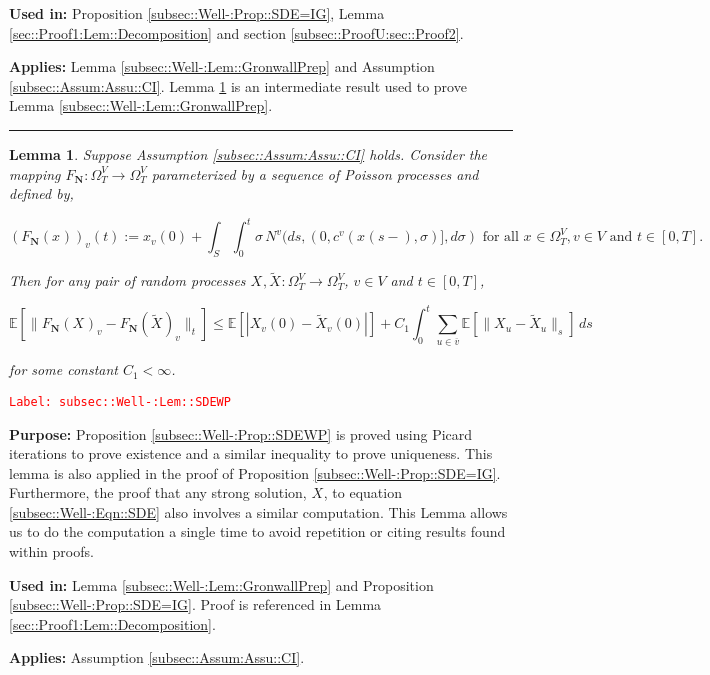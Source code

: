 \documentclass[12pt]{article}
\newcommand{\mb}{\mathbb}
\newcommand{\ra}{\rightarrow}
\newcommand{\ov}{\overline}
\newcommand{\te}{\text}
\newcommand{\tr}{\textcolor{red}}
\newcommand{\labe}[1]{\tr{\texttt{Label: #1}}}
\newcommand{\purpose}{\textbf{Purpose: }}
\newcommand{\usein}{\textbf{Used in: }}
\newcommand{\app}{\textbf{Applies: }}
\newcommand{\lin}{\rule{\linewidth}{0.4 pt}}
\newcommand{\ex}[1]{\mb{E}\left[#1\right]}			%
\renewcommand{\v}{v}							%
\newcommand{\vv}{u}								%
\renewcommand{\S}{S}							%
\newcommand{\s}{\sigma}							%
\newcommand{\T}{T}								%
\newcommand{\x}{x}								%
\renewcommand{\t}{t}							%
\newcommand{\sset}{\Omega}						%
\renewcommand{\tt}{s}							%
\newcommand{\X}{X}								%
\newcommand{\IGr}{c}							%
\newcommand{\vind}[1]{^{#1}}					%
\newcommand{\vsi}[1]{^{#1}}						%
\newcommand{\cind}[1]{_{#1}}					%
\newcommand{\cl}{\ov}							%
\newcommand{\tp}[1]{(#1)}						%
\newcommand{\tip}[1]{#1}						%
\newcommand{\ts}[1]{_{#1}}						%
\newcommand{\const}{C}							%
\newcommand{\poisses}{\mathbf{N}}				%
\newcommand{\poiss}{N}							%
\newcommand{\Fpo}{F_{\poisses}}					%
\newcommand{\alt}[1]{\widetilde{#1}}			%
\newcommand{\indx}[1]{_{#1}}					%
\newtheorem{lem}[thms]{Lemma}
\begin{document}
\usein Proposition \ref{subsec::Well-:Prop::SDE=IG}, Lemma \ref{sec::Proof1:Lem::Decomposition} and section \ref{subsec::ProofU:sec::Proof2}.

\app Lemma \ref{subsec::Well-:Lem::GronwallPrep} and Assumption \ref{subsec::Assum:Assu::CI}. Lemma \ref{subsec::Well-:Lem::SDEWP} is an intermediate result used to prove Lemma \ref{subsec::Well-:Lem::GronwallPrep}.

\lin

\begin{lem}
Suppose Assumption \ref{subsec::Assum:Assu::CI} holds. Consider the mapping \(\Fpo: \sset\vsi{V}\ts{\T} \ra \sset\vsi{V}\ts{\T}\) parameterized by a sequence of Poisson processes and defined by,

\[\left(\Fpo(\x\cind{}\tip{})\right)\cind{\v}\tp{\t} := \x\cind{\v}\tp{0} + \int_\S\int_0^\t \s \,\poiss\vind{\v}(d\tt,(0,\IGr\vind{\v}(\x\cind{}\tp{\tt-},\s)],d\s) \te{ for all }\x\cind{}\tip{} \in \sset\vsi{V}\ts{\T}, \v \in V\te{ and }\t \in [0,\T].\]

Then for any pair of random processes \(\X\cind{}\tip{},\alt{\X}\cind{}\tip{}:\sset\vsi{V}\ts{\T} \ra \sset\vsi{V}\ts{\T}\), \(\v\in V\) and \(\t \in [0,\T]\),

\[\ex{\|\Fpo(\X\cind{}\tip{})\cind{\v} - \Fpo(\alt{\X}\cind{}\tip{})\cind{\v}\|_\t} \leq \ex{|\X\cind{\v}\tp{0} - \alt{\X}\cind{\v}\tp{0}|} +  \const\indx{1}\int_0^\t \sum_{\vv\in \cl{\v}} \ex{\|\X\cind{\vv}\tip{} - \alt{\X}\cind{\vv}\tip{}\|_\tt}\,d\tt\]

for some constant \(\const\indx{1} < \infty\).

\label{subsec::Well-:Lem::SDEWP}
\end{lem}
\labe{subsec::Well-:Lem::SDEWP}

\purpose Proposition \ref{subsec::Well-:Prop::SDEWP} is proved using Picard iterations to prove existence and a similar inequality to prove uniqueness. This lemma is also applied in the proof of Proposition \ref{subsec::Well-:Prop::SDE=IG}. Furthermore, the proof that any strong solution, \(\X\cind{}\tip{}\), to equation \eqref{subsec::Well-:Eqn::SDE} also involves a similar computation. This Lemma allows us to do the computation a single time to avoid repetition or citing results found within proofs.

\usein Lemma \ref{subsec::Well-:Lem::GronwallPrep} and Proposition \ref{subsec::Well-:Prop::SDE=IG}. Proof is referenced in Lemma \ref{sec::Proof1:Lem::Decomposition}.

\app Assumption \ref{subsec::Assum:Assu::CI}.
\end{document}
